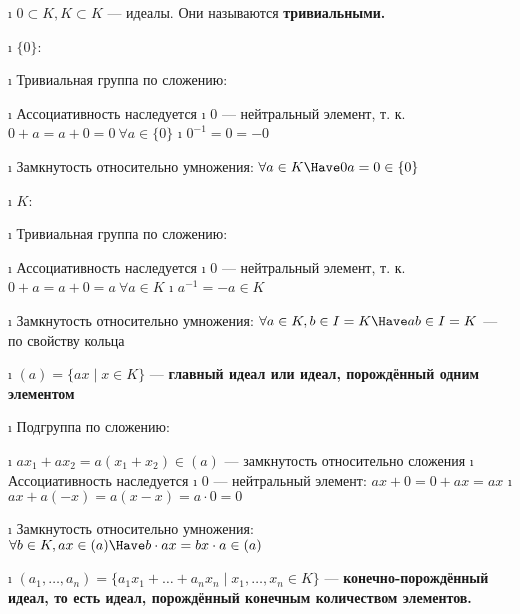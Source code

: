 \begin{solution}

\begin{enumerate}[label=\asbuk{enumi})]
\tightlist
\i
  \(0 \subset K, K \subset K\) --- идеалы. Они называются \bf{тривиальными}.

  \begin{itemize}
  \tightlist
  \i
    \(\{0\}\):

    \begin{enumerate}[label=\arabic{enumii}.]
    \tightlist
    \i
      Тривиальная группа по сложению:

      \begin{itemize}
      \tightlist
      \i
        Ассоциативность наследуется
      \i
        \(0\) --- нейтральный элемент, т. к. \(0+a=a+0=0\ \forall a \in \{0\}\)
      \i
        \(0^{-1} = 0 = -0\)
      \end{itemize}
    \i
      Замкнутость относительно умножения: \(\forall a \in K \Have  0a=0 \in \{0\}\)
    \end{enumerate}
  \i
    \(K\):

    \begin{enumerate}[label=\arabic{enumii}.]
    \tightlist
    \i
      Тривиальная группа по сложению:

      \begin{itemize}
      \tightlist
      \i
        Ассоциативность наследуется
      \i
        \(0\) --- нейтральный элемент, т. к. \(0+a=a+0=a\ \forall a \in K\)
      \i
        \(a^{-1} = -a \in K\)
      \end{itemize}
    \i
      Замкнутость относительно умножения:
      \(\forall a \in K, b \in I=K \Have ab \in I=K\) --- по свойству кольца
    \end{enumerate}
  \end{itemize}
\i
  \((a) = \{ax \mid x\in K\}\) --- \bf{главный идеал} или \bf{идеал, порождённый одним элементом}

  \begin{enumerate}[label=\arabic{enumii}.]
  \tightlist
  \i
    Подгруппа по сложению:

    \begin{itemize}
    \tightlist
    \i
      \(ax_1+ax_2=a(x_1+x_2)\in(a)\) --- замкнутость относительно сложения
    \i
      Ассоциативность наследуется
    \i
      \(0\) --- нейтральный элемент: \(ax+0=0+ax=ax\)
    \i
      \(ax+a(-x)=a(x-x)=a\cdot 0=0\)
    \end{itemize}
  \i
    Замкнутость относительно умножения:
    \(\forall b \in K, ax \in (a) \Have b\cdot ax = bx \cdot a \in (a)\)
  \end{enumerate}
\i
  \((a_1,\ldots,a_n) = \{a_1x_1+\ldots+a_nx_n \mid x_1,\ldots,x_n \in K\}\) --- \bf{конечно-порождённый идеал}, то есть идеал, порождённый конечным количеством элементов.


\end{enumerate}
\end{solution}
